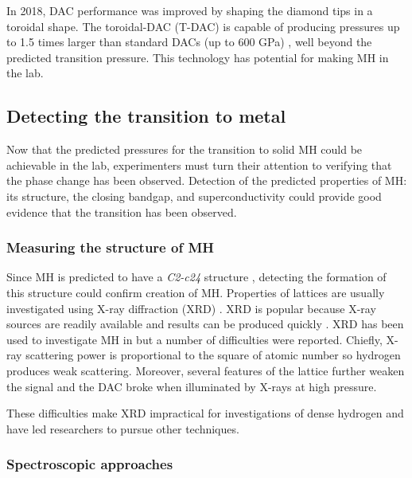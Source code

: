 \documentclass[esp]{FCEFyN-class}
\begin{document}
In 2018, DAC performance was improved by shaping the diamond tips in a toroidal shape. The toroidal-DAC (T-DAC) is capable of producing pressures up to 1.5 times larger than standard DACs (up to 600 GPa) \cite{LoubeyreTDAC}, well beyond the predicted transition pressure. This technology has potential for making MH in the lab.

\subsection{Detecting the transition to metal}

Now that the predicted pressures for the transition to solid MH could be achievable in the lab, experimenters must turn their attention to verifying that the phase change has been observed. Detection of the predicted properties of MH: its structure, the closing bandgap, and superconductivity could provide good evidence that the transition has been observed.

\subsubsection{Measuring the structure of MH}

Since MH is predicted to have a \textit{C2-c24} structure \cite{Dogan2020}, detecting the formation of this structure could confirm creation of MH. Properties of lattices are usually investigated using X-ray diffraction (XRD) \cite{Nave2017XRD}. %
XRD is popular because X-ray sources are readily available and results can be produced quickly \cite{Dutrow2020}. XRD has been used to investigate MH in \cite{ji_li_liu_smith_et_al_2019} but a number of difficulties were reported. Chiefly, X-ray scattering power is proportional to the square of atomic number so hydrogen produces weak scattering. Moreover, several features of the lattice further weaken the signal and the DAC broke when illuminated by X-rays at high pressure.%

These difficulties make XRD impractical for investigations of dense hydrogen and have led researchers to pursue other techniques.

\subsubsection{Spectroscopic approaches}
\end{document}
